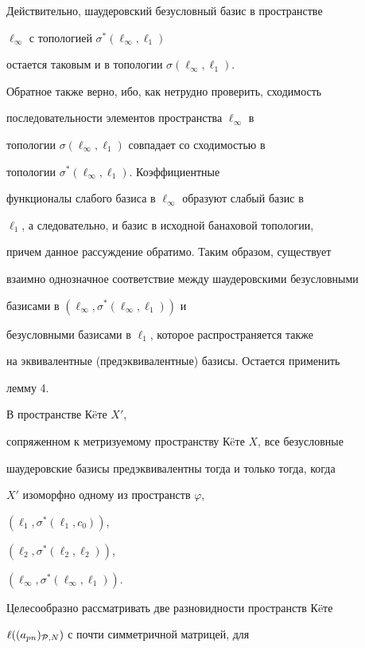 Действительно, шаудеровский безусловный базис в пространстве


$\ell_\infty$ с топологией $\sigma^*(\ell_\infty,\ell_1)$


остается таковым и в топологии $\sigma(\ell_\infty,\ell_1)$.


Обратное также верно, ибо, как нетрудно проверить, сходимость


последовательности элементов пространства $\ell_\infty$ в


топологии $\sigma(\ell_\infty,\ell_1)$ совпадает со сходимостью в


топологии $\sigma^*(\ell_\infty,\ell_1)$. Коэффициентные


функционалы слабого базиса в $\ell_\infty$ образуют слабый базис в


$\ell_1$, а следовательно, и базис в исходной банаховой топологии,


причем данное рассуждение обратимо. Таким образом, существует


взаимно однозначное соответствие между шаудеровскими безусловными


базисами в $(\ell_\infty,\sigma^*(\ell_\infty,\ell_1))$ и


безусловными базисами в $\ell_1$, которое распространяется также


на эквивалентные (предэквивалентные) базисы. Остается применить


лемму 4.





\begin{cor}


В пространстве К\"eте $X'$,


сопряженном к метризуемому пространству К\"eте $X$, все безусловные 


шаудеровские базисы предэквивалентны тогда и только тогда, когда


$X'$ изоморфно одному из пространств $\varphi$,


$(\ell_1,\sigma^*(\ell_1, c_0))$,


$(\ell_2,\sigma^*(\ell_2, \ell_2))$,


$(\ell_\infty,\sigma^*(\ell_\infty, \ell_1))$.


\end{cor}





Целесообразно рассматривать две разновидности пространств К\"eте


$\ell((a_{pn})_{{\cal P},N})$ с почти симметричной матрицей, для


